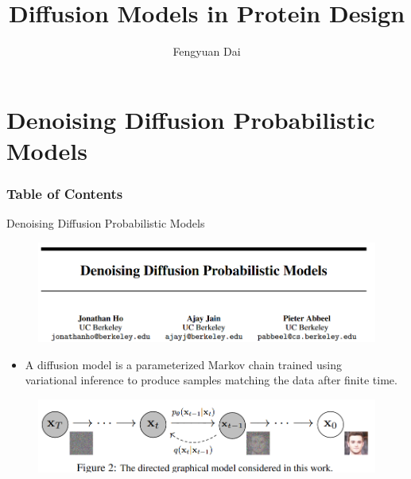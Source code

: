 \documentclass[notheorems, aspectratio=54]{beamer}
\title[Diffusion Models in Protein Design]{Diffusion Models in Protein Design}
\author{Fengyuan Dai}
\institute[Westlake University]{daifengyuan@westlake.edu.cn}
\begin{document}
\begin{frame}
    \titlepage
\end{frame}

\section{Denoising Diffusion Probabilistic Models}
\begin{frame}
    \frametitle{Table of Contents}
    \tableofcontents[currentsection]
\end{frame}


\begin{frame}{Denoising Diffusion Probabilistic Models}
  \vspace{-3mm}
  \begin{figure}[!h]
      \centering
      \includegraphics[width=0.9\linewidth]{figures/ddpm.png}
  \end{figure}
  \begin{itemize}
    \item A diffusion model is a parameterized Markov chain trained using    \\
    variational inference to produce samples matching the data after finite time.
  \end{itemize}
  \vspace{-3mm}
  \begin{figure}[!h]
    \centering
    \includegraphics[width=0.8\linewidth]{figures/ddpm_fig2.png}
\end{figure}
\end{frame}
\end{document}
